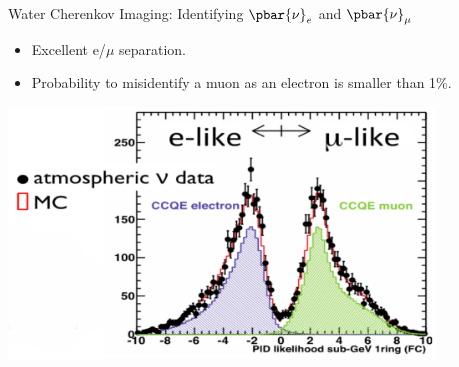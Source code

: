 %
%
%
\begin{frame}{Water Cherenkov Imaging: Identifying $\pbar{\nu}_{e}$ and  $\pbar{\nu}_{\mu}$}

  \begin{itemize}
    \item Excellent e/$\mu$ separation.
    \item Probability to misidentify a muon as an electron is smaller than 1\%.
  \end{itemize}

  \begin{center}
   \includegraphics[width=0.85\textwidth]{./images/3nu/accelerator/t2k/emuPID}
  \end{center}

\end{frame}

%
%
%


